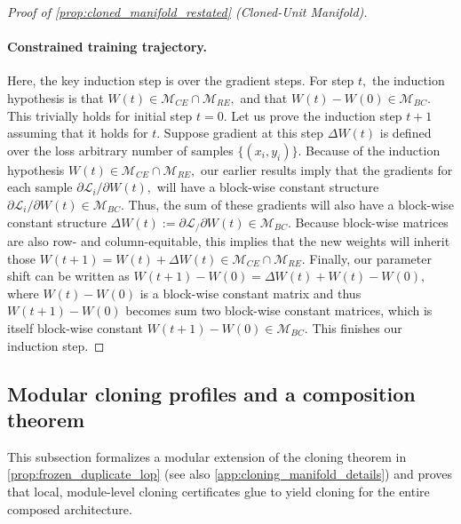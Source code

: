 \documentclass{article}
\newcommand{\Loss}{\mathcal{L}}
\newcommand{\ManifoldRE}{\mathcal{M}_{RE}}
\newcommand{\ManifoldCE}{\mathcal{M}_{CE}}
\newcommand{\ManifoldBC}{\mathcal{M}_{BC}}
\numberwithin{figure}{section}
\begin{document}
\begin{proof}[Proof of \cref{prop:cloned_manifold_restated} (Cloned-Unit Manifold)]
\paragraph{Constrained training trajectory.} Here, the key induction step is over the gradient steps. For step $t,$ the induction hypothesis is that $W(t) \in \ManifoldCE\cap\ManifoldRE,$ and that $W(t)-W(0) \in \ManifoldBC. $ This trivially holds for initial step $t=0.$ Let us prove the induction step $t+1$ assuming that it holds for $t.$ Suppose gradient at this step $\Delta W(t)$ is defined over the loss arbitrary number of samples $\{(x_i,y_i)\}.$ Because of the induction hypothesis $W(t) \in \ManifoldCE\cap\ManifoldRE,$ our earlier results imply that the gradients for each sample $\partial \Loss_i / \partial W(t),$ will have a block-wise constant structure $\partial \Loss_i / \partial W(t) \in \ManifoldBC. $ Thus, the sum of these gradients will also have a block-wise constant structure $\Delta W(t) := \partial \Loss_ / \partial W(t) \in \ManifoldBC. $ Because block-wise matrices are also row- and column-equitable, this implies that the new weights will inherit those $W(t+1) = W(t) + \Delta W(t) \in \ManifoldCE\cap\ManifoldRE. $  Finally, our parameter shift can be written as $W(t+1)-W(0) = \Delta W(t) + W(t)-W(0), $  where $W(t)-W(0)  $ is a block-wise constant matrix and thus $W(t+1)-W(0)$ becomes sum two block-wise constant matrices, which is itself block-wise constant $W(t+1)-W(0)\in \ManifoldBC. $ This finishes our induction step. 
\end{proof}






\subsection{Modular cloning profiles and a composition theorem}
\label{app:modular_cloning}

This subsection formalizes a modular extension of the cloning theorem in \cref{prop:frozen_duplicate_lop} (see also \cref{app:cloning_manifold_details}) and proves that local, module-level cloning certificates glue to yield cloning for the entire composed architecture.
\end{document}
